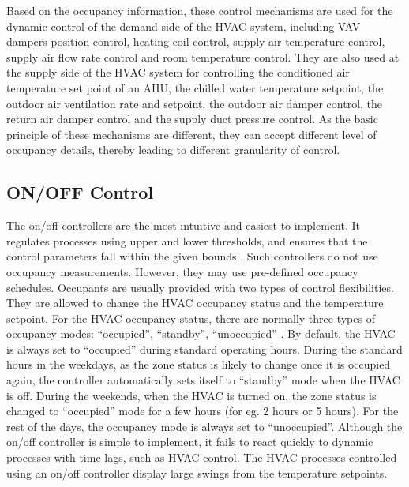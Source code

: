 Based on the occupancy information, these control mechanisms are used for the dynamic control of the demand-side of the HVAC system, including VAV dampers position control, heating coil control, supply air temperature control, supply air flow rate control and room temperature control. They are also used at the supply side of the HVAC system for controlling the conditioned air temperature set point of an AHU, the chilled water temperature setpoint, the outdoor air ventilation rate and setpoint, the outdoor air damper control, the return air damper control and the supply duct pressure control. As the basic principle of these mechanisms are different, they can accept different level of occupancy details, thereby leading to different granularity of control.

\subsection{ON/OFF Control}

The on/off controllers are the most intuitive and easiest to implement. It regulates processes using upper and lower thresholds, and ensures that the control parameters fall within the given bounds \citep{kolokotsa2001advanced,balaji2013zonepac}. Such controllers do not use occupancy measurements. However, they may use pre-defined occupancy schedules. Occupants are usually provided with two types of control flexibilities. They are allowed to change the HVAC occupancy status and the temperature setpoint. For the HVAC occupancy status, there are normally three types of occupancy modes: ``occupied'', ``standby'', ``unoccupied'' \citep{balaji2013zonepac}. By default, the HVAC is always set to ``occupied'' during standard operating hours. During the standard hours in the weekdays, as the zone status is likely to change once it is occupied again, the controller automatically sets itself to ``standby'' mode when the HVAC is off. During the weekends, when the HVAC is turned on, the zone status is changed to ``occupied'' mode for a few hours (for eg. 2 hours or 5 hours). For the rest of the days, the occupancy mode is always set to ``unoccupied''. Although the on/off controller is simple to implement, it fails to react quickly to dynamic processes with time lags, such as HVAC control. The HVAC processes controlled using an on/off controller display large swings from the temperature setpoints.

